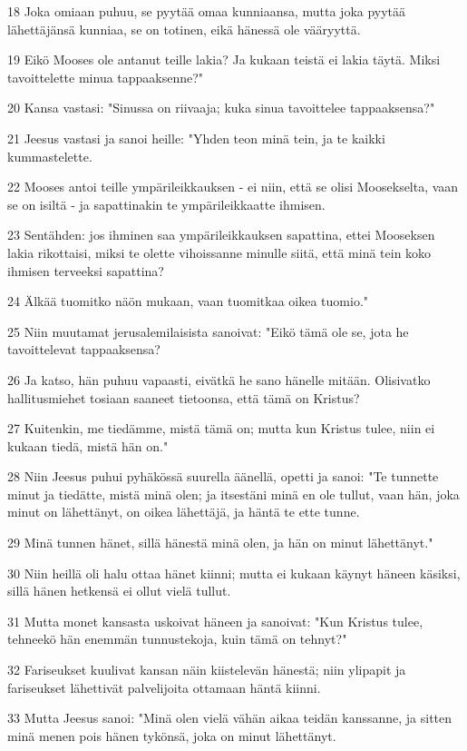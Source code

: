 \par 18 Joka omiaan puhuu, se pyytää omaa kunniaansa, mutta joka pyytää lähettäjänsä kunniaa, se on totinen, eikä hänessä ole vääryyttä.
\par 19 Eikö Mooses ole antanut teille lakia? Ja kukaan teistä ei lakia täytä. Miksi tavoittelette minua tappaaksenne?"
\par 20 Kansa vastasi: "Sinussa on riivaaja; kuka sinua tavoittelee tappaaksensa?"
\par 21 Jeesus vastasi ja sanoi heille: "Yhden teon minä tein, ja te kaikki kummastelette.
\par 22 Mooses antoi teille ympärileikkauksen - ei niin, että se olisi Moosekselta, vaan se on isiltä - ja sapattinakin te ympärileikkaatte ihmisen.
\par 23 Sentähden: jos ihminen saa ympärileikkauksen sapattina, ettei Mooseksen lakia rikottaisi, miksi te olette vihoissanne minulle siitä, että minä tein koko ihmisen terveeksi sapattina?
\par 24 Älkää tuomitko näön mukaan, vaan tuomitkaa oikea tuomio."
\par 25 Niin muutamat jerusalemilaisista sanoivat: "Eikö tämä ole se, jota he tavoittelevat tappaaksensa?
\par 26 Ja katso, hän puhuu vapaasti, eivätkä he sano hänelle mitään. Olisivatko hallitusmiehet tosiaan saaneet tietoonsa, että tämä on Kristus?
\par 27 Kuitenkin, me tiedämme, mistä tämä on; mutta kun Kristus tulee, niin ei kukaan tiedä, mistä hän on."
\par 28 Niin Jeesus puhui pyhäkössä suurella äänellä, opetti ja sanoi: "Te tunnette minut ja tiedätte, mistä minä olen; ja itsestäni minä en ole tullut, vaan hän, joka minut on lähettänyt, on oikea lähettäjä, ja häntä te ette tunne.
\par 29 Minä tunnen hänet, sillä hänestä minä olen, ja hän on minut lähettänyt."
\par 30 Niin heillä oli halu ottaa hänet kiinni; mutta ei kukaan käynyt häneen käsiksi, sillä hänen hetkensä ei ollut vielä tullut.
\par 31 Mutta monet kansasta uskoivat häneen ja sanoivat: "Kun Kristus tulee, tehneekö hän enemmän tunnustekoja, kuin tämä on tehnyt?"
\par 32 Fariseukset kuulivat kansan näin kiistelevän hänestä; niin ylipapit ja fariseukset lähettivät palvelijoita ottamaan häntä kiinni.
\par 33 Mutta Jeesus sanoi: "Minä olen vielä vähän aikaa teidän kanssanne, ja sitten minä menen pois hänen tykönsä, joka on minut lähettänyt.
